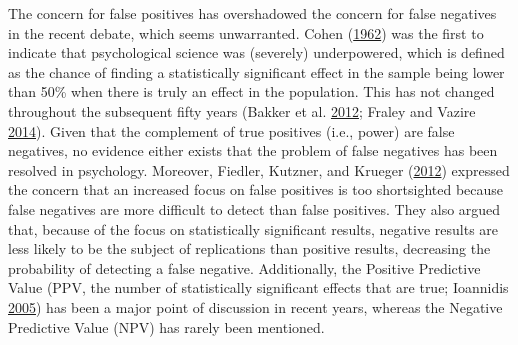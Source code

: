 \documentclass[a5paper]{book}
\begin{document}
The concern for false positives has overshadowed the concern for false
negatives in the recent debate, which seems unwarranted. Cohen
(\protect\hyperlink{ref-doi:10.1037ux2fh0045186}{1962}) was the first to
indicate that psychological science was (severely) underpowered, which
is defined as the chance of finding a statistically significant effect
in the sample being lower than 50\% when there is truly an effect in the
population. This has not changed throughout the subsequent fifty years
(Bakker et al.
\protect\hyperlink{ref-doi:10.1177ux2f1745691612459060}{2012}; Fraley
and Vazire
\protect\hyperlink{ref-doi:10.1371ux2fjournal.pone.0109019}{2014}).
Given that the complement of true positives (i.e., power) are false
negatives, no evidence either exists that the problem of false negatives
has been resolved in psychology. Moreover, Fiedler, Kutzner, and Krueger
(\protect\hyperlink{ref-doi:10.1177ux2f1745691612462587}{2012})
expressed the concern that an increased focus on false positives is too
shortsighted because false negatives are more difficult to detect than
false positives. They also argued that, because of the focus on
statistically significant results, negative results are less likely to
be the subject of replications than positive results, decreasing the
probability of detecting a false negative. Additionally, the Positive
Predictive Value (PPV, the number of statistically significant effects
that are true; Ioannidis
\protect\hyperlink{ref-doi:10.1371ux2fjournal.pmed.0020124}{2005}) has
been a major point of discussion in recent years, whereas the Negative
Predictive Value (NPV) has rarely been mentioned.
\end{document}
